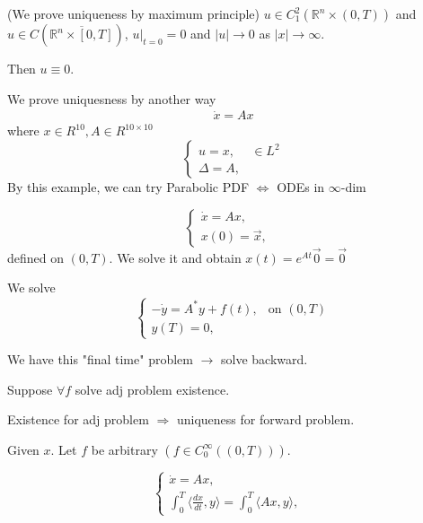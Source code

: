 \documentclass[11pt]{article}
\begin{document}
\begin{theorem}[Uniqueness]
    (We prove uniqueness by maximum principle) $u \in C_{1}^{2}(\mathbb{R}^{n}\times (0,T))$ and 
    $u \in C(\overline{\mathbb{R}^{n} \times [0,T]})$, $u|_{t=0} = 0$ and 
    $|u| \longrightarrow 0$ as $|x| \longrightarrow \infty$.

    Then $u \equiv 0$.
\end{theorem}

We prove uniquesness by another way 
\begin{align*}
    \dot{x} = Ax
\end{align*}
where $x \in R^{10}, A \in R^{10 \times 10}$
\begin{equation}
    \begin{cases} 
    u = x, & \in L^{2}  \\ 
    \Delta = A, &   
    \end{cases}
\end{equation}
By this example, we can try Parabolic PDF $\iff$ ODEs in $\infty$-dim


\begin{equation}
    \begin{cases} 
    \dot{x} = Ax, &  \\ 
    x(0) = \vec{x}, &   
    \end{cases}
\end{equation}
defined on $(0,T)$. We solve it and obtain $x(t) = e^{At}\vec{0} = \vec{0}$

We solve 
\begin{equation}
    \begin{cases} 
    -\dot{y} = A^{*}y + f(t), & \text{on } (0,T)  \\ 
    y(T) = 0, &
    \end{cases}
\end{equation}

We have this "final time" problem $\longrightarrow$ solve backward.

Suppose $\forall  f$ solve adj problem existence.

Existence for adj problem $\Longrightarrow$ uniqueness for forward problem.

Given $x$. Let $f$ be arbitrary $(f \in C_{0}^{\infty}((0,T)))$.

\begin{equation}
    \begin{cases} 
    \dot{x} = Ax, &  \\ 
    \int_{0}^{T}\langle \frac{dx}{dt}, y \rangle = \int_{0}^{T}\langle Ax,y \rangle,   
    \end{cases}
\end{equation}
\end{document}
